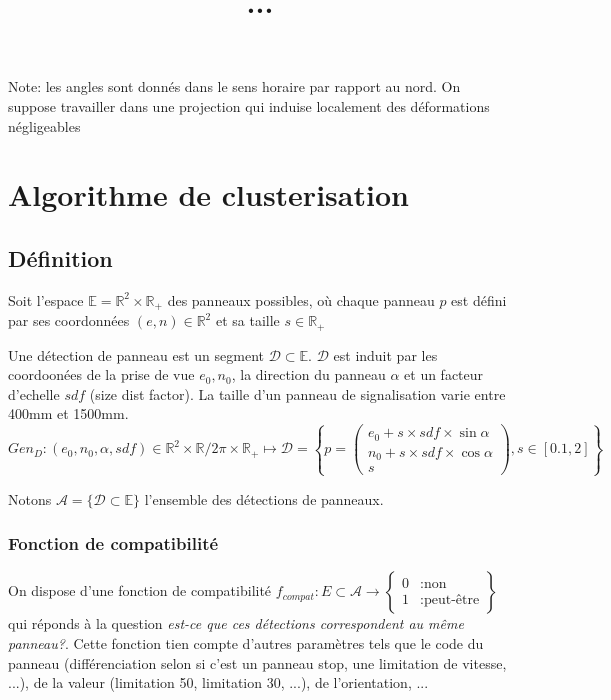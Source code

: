 \documentclass{article}
\title{...}
\begin{document}
\maketitle

\tableofcontents

\newpage

Note: les angles sont donnés dans le sens horaire par rapport au nord. On suppose travailler dans une projection qui induise localement des déformations négligeables 
\section{Algorithme de clusterisation}

\subsection{Définition}

Soit l'espace \(\mathbb{E} = \mathbb{R}^{2} \times \mathbb{R}_{+}\) des panneaux possibles, où chaque panneau \(p\) est défini par ses coordonnées \((e, n) \in \mathbb{R}^{2}\) et sa taille \(s \in \mathbb{R}_{+}\)

Une détection de panneau est un segment \(\mathscr{D} \subset \mathbb{E}\). \(\mathscr{D}\) est induit par les coordoonées de la prise de vue \(e_0, n_0\), la direction du panneau \(\alpha\) et un facteur d'echelle \(sdf\) (size dist factor). La taille d'un panneau de signalisation varie entre 400mm et 1500mm. \[Gen_D : (e_0, n_0, \alpha, sdf) \in \mathbb{R}^{2}\times\mathbb{R}/2\pi\times\mathbb{R}_{+} \mapsto \mathscr{D} = \left\{ p = \begin{pmatrix}e_0 + s\times sdf \times \sin \alpha \\ n_0 + s \times sdf \times \cos \alpha \\ s \end{pmatrix}, s \in [0.1, 2]\right\}\]

Notons \(\mathscr{A} = \{ \mathscr{D} \subset \mathbb{E} \}\) l'ensemble des détections de panneaux.

\subsubsection{Fonction de compatibilité}
\label{def_f_compat}
On dispose d'une fonction de compatibilité \(f_{compat}: E \subset \mathscr{A} \to \left\{\begin{aligned}0&\text{:non}\\ 1&\text{:peut-être}\end{aligned}\right\}\) qui réponds à la question \textit{est-ce que ces détections correspondent au même panneau?}. Cette fonction tien compte d'autres paramètres tels que le code du panneau (différenciation selon si c'est un panneau stop, une limitation de vitesse, ...), de la valeur (limitation 50, limitation 30, ...), de l'orientation, ...
\end{document}
